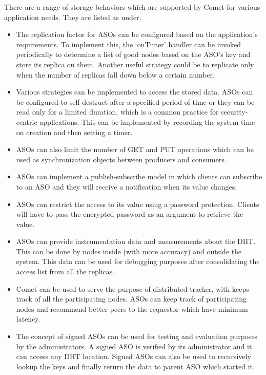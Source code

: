 \documentclass[11pt,a4paper]{article}
\begin{document}
    There are a range of storage behaviors which are supported by Comet for various application needs. They are listed as under.
    \begin{itemize}
        
        \item	The replication factor for ASOs can be configured based on the application’s requirements. To implement this, the ‘onTimer’ handler can be invoked periodically to determine a list of good nodes based on the ASO’s key and store its replica on them. Another useful strategy could be to replicate only when the number of replicas fall down below a certain number.
        \item	Various strategies can be implemented to access the stored data. ASOs can be configured to self-destruct after a specified period of time or they can be read only for a limited duration, which is a common practice for security-centric applications. This can be implemented by recording the system time on creation and then setting a timer. 
        \item	ASOs can also limit the number of GET and PUT operations which can be used as synchronization objects between producers and consumers.
        \item	ASOs can implement a publish-subscribe model in which clients can subscribe to an ASO and they will receive a notification when its value changes.
        \item	ASOs can restrict the access to its value using a password protection. Clients will have to pass the encrypted password as an argument to retrieve the value.
        \item	ASOs can provide instrumentation data and measurements about the DHT. This can be done by nodes inside (with more accuracy) and outside the system. This data can be used for debugging purposes after consolidating the access list from all the replicas.
        \item	Comet can be used to serve the purpose of distributed tracker, with keeps track of all the participating nodes. ASOs can keep track of participating nodes and recommend better peers to the requestor which have minimum latency.
        \item	The concept of signed ASOs can be used for testing and evaluation purposes by the administrators. A signed ASO is verified by its administrator and it can access any DHT location. Signed ASOs can also be used to recursively lookup the keys and finally return the data to parent ASO which started it.
    \end{itemize}
    
\end{document}
